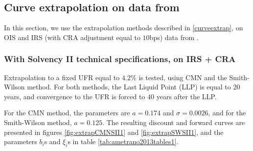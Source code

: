 \subsection{Curve extrapolation on data from \cite{ametrano2013everything}}
\label{curveextrapexamples}

In this section, we use the extrapolation methods described in \ref{curveextrap}, on OIS and IRS (with CRA adjustment equal to $10$bps) data from \cite{ametrano2013everything}.

\subsubsection{With Solvency II technical specifications, on IRS + CRA}

Extrapolation to a fixed UFR equal to $4.2\%$ is tested, using CMN and the Smith-Wilson method. For both methods, the Last Liquid Point (LLP) is equal to 20 years, and convergence to the UFR is forced to 40 years after the LLP.

\medskip

For the CMN method, the parameters are $a = 0.174$ and $\sigma = 0.0026$, and for the Smith-Wilson method,  $a = 0.125$. The resulting discount and forward curves are presented in figures \ref{fig:extrapCMNSII1} and \ref{fig:extrapSWSII1}, and the parameters $b_i$s and $\xi_i$s in table \ref{tab:ametrano2013tables1}.

